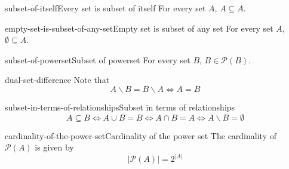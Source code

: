 \documentclass[preview]{standalone}
\begin{document}
\begin{snippetcorollary}{subset-of-itself}{Every set is subset of itself}
    For every set \(A\), \(A \subseteq A\).
\end{snippetcorollary}

\begin{snippetcorollary}{empty-set-is-subset-of-any-set}{Empty set is subset of any set}
    For every set \(A\),
    \(\emptyset \subseteq A\).
\end{snippetcorollary}

\begin{snippetcorollary}{subset-of-powerset}{Subset of powerset}
    For every set \(B\), \(B\in\mathcal{P}(B)\).
\end{snippetcorollary}

\begin{snippetcorollary}{dual-set-difference}{}
    Note that
    \[
        A \backslash B = B \backslash A
        \iff A = B
    \]
\end{snippetcorollary}

\begin{snippetcorollary}{subset-in-terms-of-relationships}{Subset in terms of relationships}
    \[
        A \subseteq B
        \iff
        A \cup B = B
        \iff
        A \cap B = A
        \iff
        A \backslash B = \emptyset
    \]
\end{snippetcorollary}

\begin{snippettheorem}{cardinality-of-the-power-set}{Cardinality of the power set}
    The cardinality of \(\mathcal{P}(A)\) is given by
    \[
        |\mathcal{P}(A)| = 2^{|A|}
    \]
\end{snippettheorem}
\end{document}
